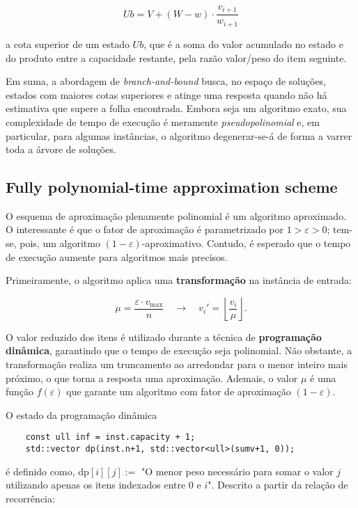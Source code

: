 \documentclass[12pt]{article}
\begin{document}
\[
Ub = V + (W - w) \cdot \frac{v_{i+1}}{w_{i+1}}
\]

a cota superior de um estado \(Ub\), que é a soma do valor acumulado no estado e do produto entre a capacidade restante, pela razão valor/peso do item seguinte.

Em suma, a abordagem de \textit{branch-and-bound} busca, no espaço de soluções, estados com maiores cotas superiores e atinge uma resposta quando não há estimativa que supere a folha encontrada. Embora seja um algoritmo exato, sua complexidade de tempo de execução é meramente \textit{pseudopolinomial} e, em particular, para algumas instâncias, o algoritmo degenerar-se-á de forma a varrer toda a árvore de soluções.


\subsection{Fully polynomial-time approximation scheme}

O esquema de aproximação plenamente polinomial é um algoritmo aproximado. O interessante é que o fator de aproximação é parametrizado por \(1 > \varepsilon > 0\); tem-se, pois, um algoritmo \((1 - \varepsilon)\)-aproximativo. Contudo, é esperado que o tempo de execução aumente para algoritmos mais precisos.

Primeiramente, o algoritmo aplica uma \textbf{transformação} na instância de entrada:

\[
\mu = \frac{\varepsilon \cdot v_{\text{max}}}{n} \quad \rightarrow \quad v_i' = \left\lfloor \frac{v_i}{\mu} \right\rfloor.
\]

O valor reduzido dos itens é utilizado durante a técnica de \textbf{programação dinâmica}, garantindo que o tempo de execução seja polinomial. Não obstante, a transformação realiza um truncamento ao arredondar para o menor inteiro mais próximo, o que torna a resposta uma aproximação. Ademais, o valor \(\mu\) é uma função \(f(\varepsilon)\) que garante um algoritmo com fator de aproximação \((1 - \varepsilon)\).

O estado da programação dinâmica

\begin{verbatim}
    const ull inf = inst.capacity + 1;
    std::vector dp(inst.n+1, std::vector<ull>(sumv+1, 0));
\end{verbatim}

é definido como, \(\text{dp}[i][j] :=\) "O menor peso necessário para somar o valor \(j\) utilizando apenas os itens indexados entre \(0\) e \(i\)". Descrito a partir da relação de recorrência:
\end{document}
